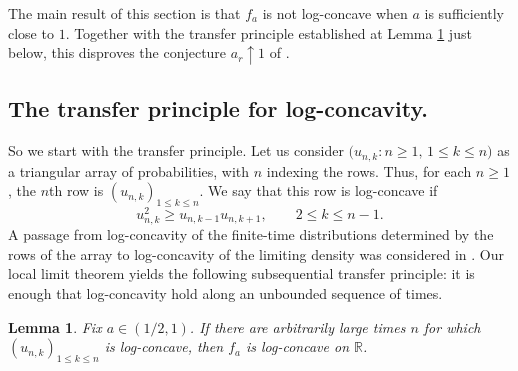 \documentclass[11pt]{article}
\numberwithin{equation}{section}
\newtheorem{lemma}[theorem]{Lemma}
\theoremstyle{remark}
\newcommand{\R}{\mathbb{R}}
\begin{document}
The main result of this section is that $f_a$ is not log-concave when $a$ is sufficiently close to $1$. Together with the transfer principle
established at Lemma \ref{lem:lc-transfer} just  below, this disproves the conjecture
$a_r\uparrow1$ of \cite{guerin-laulin-raschel-simon}. 

\subsection{The transfer principle for log-concavity.}

So we start with the transfer principle. Let us consider 
$\big(u_{n,k} : n\geq1, \, 1\leq k\leq n\big)$
as a triangular array of probabilities, with $n$ indexing the rows.
Thus, for each $n\geq1$, the $n$th row is
$(u_{n,k})_{1\leq k\leq n}$. We say that this row is log-concave if
\[
u_{n,k}^2\geq u_{n,k-1}u_{n,k+1},
\qquad 2\leq k\leq n-1.
\]
A passage from log-concavity of the finite-time distributions determined by the rows of the array to
log-concavity of the limiting density was considered in \cite[Corollary 2.4]{guerin-laulin-raschel-simon}. Our local limit
theorem yields the following subsequential transfer principle: it is
enough that log-concavity hold along an unbounded sequence of times.

\begin{lemma}\label{lem:lc-transfer}
Fix $a\in(1/2,1)$. If there are arbitrarily large times $n$ for which
$(u_{n,k})_{1\leq k\leq n}$ is log-concave, then $f_a$ is log-concave on $\R$.
\end{lemma}
\end{document}
